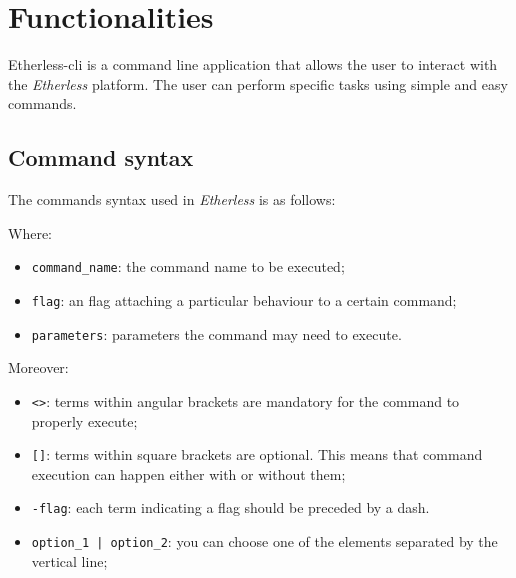 \section{Functionalities}
Etherless-cli is a command line application that allows the user to interact with the \textit{Etherless} platform. The user can perform specific tasks using simple and easy commands.

\subsection{Command syntax}
The commands syntax used in \textit{Etherless} is as follows:
\begin{center}
\end{center}
Where:
\begin{itemize}
	\item \texttt{command\_name}: the command name to be executed;
	\item \texttt{flag}: an flag attaching a particular behaviour to a certain command;
	\item \texttt{parameters}: parameters the command may need to execute.
\end{itemize}
Moreover:
\begin{itemize}
	\item \texttt{<>}: terms within angular brackets are mandatory for the command to properly execute;
	\item \texttt{[]}: terms within square brackets are optional. This means that command execution can happen either with or without them;
	\item \texttt{-flag}: each term indicating a flag should be preceded by a dash.
	\item \texttt{option\_1 | option\_2}: you can choose one of the elements separated by the vertical line;
\end{itemize}

